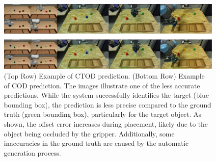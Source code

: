 \begin{figure}[t]
    \centering
    \includegraphics[width=1.0\textwidth]{figures/images/ch5/ctod_cod_prediction.jpg}
    \caption{(Top Row) Example of CTOD prediction. (Bottom Row) Example of COD prediction. The images illustrate one of the less accurate predictions. While the system successfully identifies the target (blue bounding box), the prediction is less precise compared to the ground truth (green bounding box), particularly for the target object. As shown, the offset error increases during placement, likely due to the object being occluded by the gripper. Additionally, some inaccuracies in the ground truth are caused by the automatic generation process.}
    \label{fig:ctod_cod_prediction}
\end{figure}
